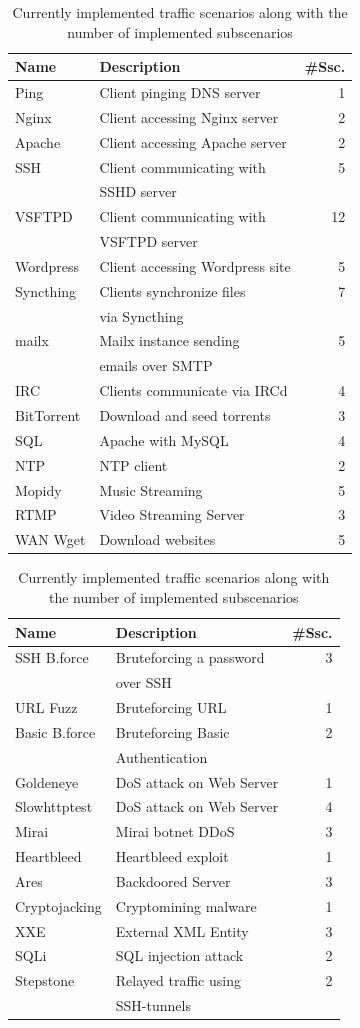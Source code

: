 \documentclass[runningheads]{llncs}
\begin{document}
\begin{table}
\begin{tabular}{l|l|r}
 \hline
 Name & Description & \#Ssc. \\
 \hline
 Ping & Client pinging DNS server & 1 \\
 Nginx & Client accessing Nginx server & 2\\
 Apache & Client accessing Apache server & 2\\
 SSH & Client communicating with & 5\\
 &SSHD server&\\
 VSFTPD & Client communicating with & 12\\
 &VSFTPD server&\\
 Wordpress & Client accessing Wordpress site & 5\\
 Syncthing& Clients synchronize files & 7\\
 &via Syncthing&\\
 mailx& Mailx instance sending & 5\\
 &emails over SMTP &\\
 IRC & Clients communicate via IRCd& 4\\
 BitTorrent & Download and seed torrents & 3 \\
 SQL & Apache with MySQL & 4\\
 NTP & NTP client & 2\\
 Mopidy & Music Streaming & 5\\
 RTMP & Video Streaming Server & 3\\
 WAN Wget & Download websites & 5 \\
\hline
\end{tabular}
\begin{tabular}{l|l|r}
 \hline
 Name & Description & \#Ssc. \\
  \hline
 SSH B.force & Bruteforcing a password & 3\\
 &over SSH&\\
 URL Fuzz & Bruteforcing URL & 1\\
 Basic B.force & Bruteforcing Basic & 2\\
 &Authentication&\\
 Goldeneye & DoS attack on Web Server & 1\\
 Slowhttptest & DoS attack on Web Server & 4 \\
 Mirai & Mirai botnet DDoS & 3\\
 Heartbleed & Heartbleed exploit & 1\\
 Ares & Backdoored Server & 3\\
 Cryptojacking & Cryptomining malware & 1\\
 XXE & External XML Entity & 3\\
 SQLi & SQL injection attack & 2 \\
 Stepstone & Relayed traffic using & 2\\
 &SSH-tunnels&\\
 \hline
\end{tabular}
\caption{Currently implemented traffic scenarios along with the number of implemented subscenarios}
\label{tab:scen}
\end{table}
\end{document}
